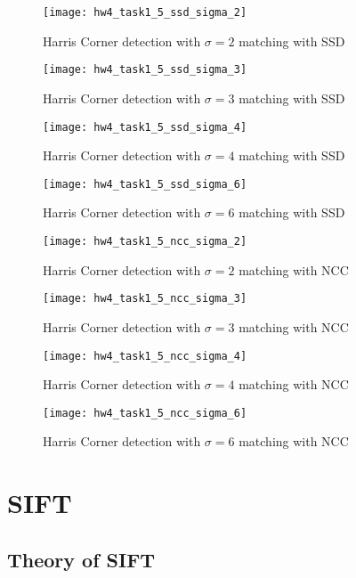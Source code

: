 \documentclass[11pt]{article}
\begin{document}
\begin{figure}[H]
\centering
\texttt{[image: hw4\_task1\_5\_ssd\_sigma\_2]}
\caption{Harris Corner detection with $\sigma = 2$ matching with SSD}
\label{}
\end{figure}
\begin{figure}[H]
\centering
\texttt{[image: hw4\_task1\_5\_ssd\_sigma\_3]}
\caption{Harris Corner detection with $\sigma = 3$ matching with SSD}
\label{}
\end{figure}
\begin{figure}[H]
\centering
\texttt{[image: hw4\_task1\_5\_ssd\_sigma\_4]}
\caption{Harris Corner detection with $\sigma = 4$ matching with SSD}
\label{}
\end{figure}
\begin{figure}[H]
\centering
\texttt{[image: hw4\_task1\_5\_ssd\_sigma\_6]}
\caption{Harris Corner detection with $\sigma = 6$ matching with SSD}
\label{}
\end{figure}

\begin{figure}[H]
\centering
\texttt{[image: hw4\_task1\_5\_ncc\_sigma\_2]}
\caption{Harris Corner detection with $\sigma = 2$ matching with NCC}
\label{}
\end{figure}
\begin{figure}[H]
\centering
\texttt{[image: hw4\_task1\_5\_ncc\_sigma\_3]}
\caption{Harris Corner detection with $\sigma = 3$ matching with NCC}
\label{}
\end{figure}
\begin{figure}[H]
\centering
\texttt{[image: hw4\_task1\_5\_ncc\_sigma\_4]}
\caption{Harris Corner detection with $\sigma = 4$ matching with NCC}
\label{}
\end{figure}
\begin{figure}[H]
\centering
\texttt{[image: hw4\_task1\_5\_ncc\_sigma\_6]}
\caption{Harris Corner detection with $\sigma = 6$ matching with NCC}
\label{}
\end{figure}


\section*{SIFT}

\subsection*{Theory of SIFT}
\end{document}
